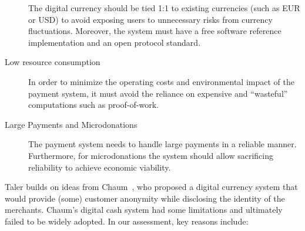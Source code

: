 \documentclass{llncs}
\begin{document}
\begin{description}
    The digital currency should be
    tied 1:1 to existing currencies (such as EUR or USD) to avoid
    exposing users to unnecessary risks from currency fluctuations.
    Moreover, the system must have a free software reference
    implementation and an open protocol standard.
  \item[Low resource consumption] In order to minimize the operating
    costs and environmental impact of the payment system, it must
    avoid the reliance on expensive and ``wasteful'' computations
    such as proof-of-work.
  \item[Large Payments and Microdonations] The payment system needs to
    handle large payments in a reliable manner.  Furthermore, for
    microdonations the system should allow sacrificing reliability to
    achieve economic viability.
\end{description}

Taler builds on ideas from Chaum~\cite{chaum1983blind}, who proposed a
digital currency system that would provide (some) customer anonymity
while disclosing the identity of the merchants.  Chaum's digital cash
system had some limitations and ultimately failed to be widely
adopted.  In our assessment, key reasons include:
\end{document}
